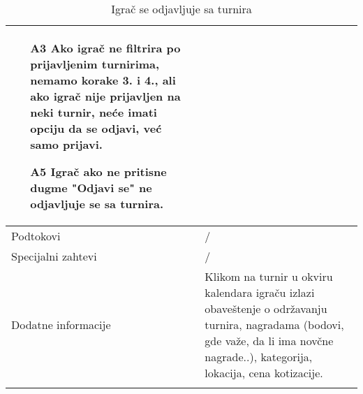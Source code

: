 \documentclass{article}
\begin{document}
\begin{longtable}{| p{} | p{} |}
\begin{itemize}
                    \item[A3] Ako igrač ne filtrira po prijavljenim turnirima, nemamo korake 3. i 4., ali ako igrač nije prijavljen na neki turnir, neće imati opciju da se odjavi, već samo prijavi.
                    \item[A5] Igrač ako ne pritisne dugme "Odjavi se" ne odjavljuje se sa turnira.
                \end{itemize}\\
            \hline
                Podtokovi & /\\
            \hline
                Specijalni zahtevi & /\\
            \hline
                Dodatne informacije & Klikom na turnir u okviru kalendara igraču izlazi obaveštenje o održavanju turnira, nagradama (bodovi, gde važe, da li ima novčne nagrade..), kategorija, lokacija, cena kotizacije. \\
            \hline
            \caption{Igrač se odjavljuje sa turnira} 
        \end{longtable}        
        
\end{document}
